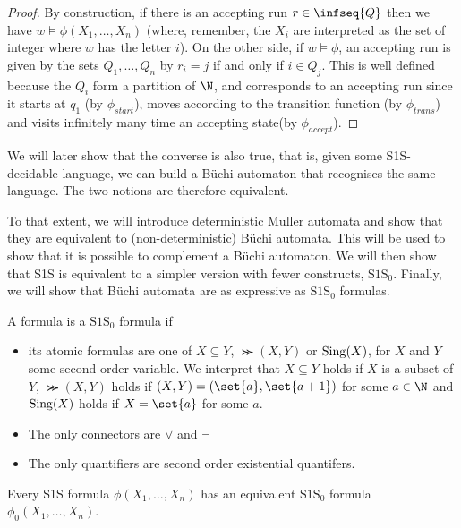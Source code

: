 \begin{proof}
    By construction, if there is an accepting run $r \in \infseq{Q}$
    then we have $w \models \phi(X_1, \dots, X_n)$ (where, remember, the $X_i$
    are interpreted as the set of integer where $w$ has the letter $i$).
    On the other side, if $w \models \phi$, an accepting run
    is given by the sets $Q_1, \dots, Q_{n}$ by $r_i = j$
    if and only if $i \in Q_j$. This is well defined because the $Q_i$
    form a partition of $\N$, and corresponds to an accepting run
    since it starts at $q_1$ (by $\phi_{start}$),
    moves according to the transition function (by $\phi_{trans}$)
    and visits infinitely many time an accepting state(by $\phi_{accept}$).
\end{proof}

We will later show that the converse is also true,
that is, given some S1S-decidable language,
we can build a Büchi automaton that recognises the same
language. The two notions are therefore equivalent.

To that extent, we will introduce deterministic Muller
automata and show that they are equivalent to (non-deterministic)
Büchi automata. This will be used to show
that it is possible to complement a Büchi automaton.
We will then show that S1S is equivalent
to a simpler version with fewer constructs, $\text{S1S}_0$.
Finally, we will show that Büchi automata are as expressive
as $\text{S1S}_0$ formulas.


\begin{definition}
    A formula is a $\text{S1S}_0$ formula if
    \begin{itemize}
        \item its atomic formulas are one of $X \subseteq Y$,
            $\Succ(X, Y)$ or $\mathrm{Sing}(X)$, for $X$ and $Y$ some second
            order variable. We interpret that $X \subseteq Y$ holds
            if $X$ is a subset of $Y$, $\Succ(X, Y)$ holds if
            $(X, Y) = (\set{a}, \set{a+1})$ for some $a \in \N$ and
            $\mathrm{Sing}(X)$ holds if $X = \set{a}$ for some $a$.
        \item The only connectors are $\vee$ and $\neg$
        \item The only quantifiers are second order existential quantifers.
    \end{itemize}
\end{definition}

\begin{lemma}
    \label{lemma:s1s-is-s1s-0}
    Every S1S formula $\phi(X_1, \dots, X_n)$ has
    an equivalent $\text{S1S}_0$ formula $\phi_0(X_1, \dots, X_n)$.
\end{lemma}

